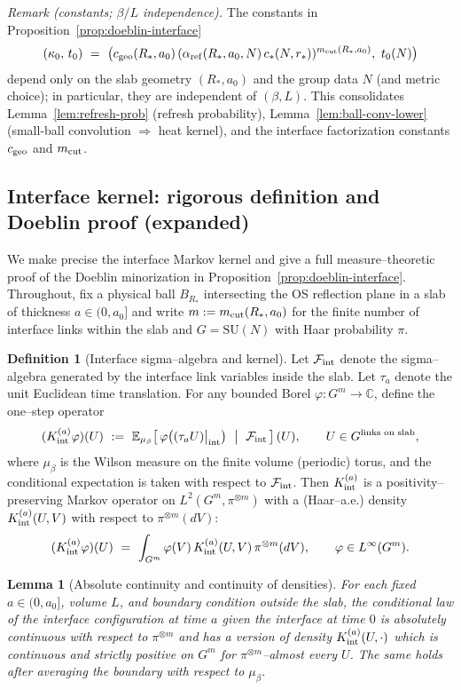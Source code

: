 \documentclass[11pt]{amsart}
\theoremstyle{plain}
\newtheorem{lemma}[theorem]{Lemma}
\theoremstyle{definition}
\newtheorem{definition}[theorem]{Definition}
\theoremstyle{remark}
\begin{document}
\noindent\emph{Remark (constants; $\beta/L$ independence).} The constants in Proposition~\ref{prop:doeblin-interface}
\[
  (\kappa_0,\,t_0)\ =\ \big(c_{\rm geo}(R_*,a_0)\,(\alpha_{\rm ref}(R_*,a_0,N)\,c_*(N,r_*))^{m_{\rm cut}(R_*,a_0)},\ t_0(N)\big)
\]
depend only on the slab geometry $(R_*,a_0)$ and the group data $N$ (and metric choice); in particular, they are independent of $(\beta,L)$. This consolidates Lemma~\ref{lem:refresh-prob} (refresh probability), Lemma~\ref{lem:ball-conv-lower} (small-ball convolution $\Rightarrow$ heat kernel), and the interface factorization constants $c_{\rm geo}$ and $m_{\rm cut}$.

\subsection*{Interface kernel: rigorous definition and Doeblin proof (expanded)}

We make precise the interface Markov kernel and give a full measure–theoretic proof of the Doeblin minorization in Proposition~\ref{prop:doeblin-interface}. Throughout, fix a physical ball $B_{R_*}$ intersecting the OS reflection plane in a slab of thickness $a\in(0,a_0]$ and write $m:=m_{\rm cut}(R_*,a_0)$ for the finite number of interface links within the slab and $G=\mathrm{SU}(N)$ with Haar probability $\pi$.

\begin{definition}[Interface sigma–algebra and kernel]\label{def:interface-kernel}
Let $\mathcal{F}_{\rm int}$ denote the sigma–algebra generated by the interface link variables inside the slab. Let $\tau_a$ denote the unit Euclidean time translation. For any bounded Borel $\varphi:G^m\to\mathbb{C}$, define the one–step operator
\[
  (K_{\rm int}^{(a)}\varphi)(U)\ :=\ \mathbb{E}_{\mu_{\beta}}\!\left[\,\varphi\big( (\tau_a U)\big|_{\rm int}\big)\ \bigm|\ \mathcal{F}_{\rm int}\,\right](U),\qquad U\in G^{\text{links on slab}},
\]
where $\mu_{\beta}$ is the Wilson measure on the finite volume (periodic) torus, and the conditional expectation is taken with respect to $\mathcal{F}_{\rm int}$. Then $K_{\rm int}^{(a)}$ is a positivity–preserving Markov operator on $L^2(G^m,\pi^{\otimes m})$ with a (Haar–a.e.) density $K_{\rm int}^{(a)}(U,V)$ with respect to $\pi^{\otimes m}(dV)$:
\[
  (K_{\rm int}^{(a)}\varphi)(U)\ =\ \int_{G^m} \varphi(V)\,K_{\rm int}^{(a)}(U,V)\,\pi^{\otimes m}(dV),\qquad \varphi\in L^\infty(G^m).
\]
\end{definition}

\begin{lemma}[Absolute continuity and continuity of densities]\label{lem:abs-cont}
For each fixed $a\in(0,a_0]$, volume $L$, and boundary condition outside the slab, the conditional law of the interface configuration at time $a$ given the interface at time $0$ is absolutely continuous with respect to $\pi^{\otimes m}$ and has a version of density $K_{\rm int}^{(a)}(U,\cdot)$ which is continuous and strictly positive on $G^m$ for $\pi^{\otimes m}$–almost every $U$. The same holds after averaging the boundary with respect to $\mu_{\beta}$.
\end{lemma}
\end{document}

